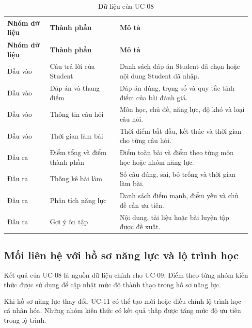 \begin{longtable}{|p{3.5cm}|p{5.3cm}|p{5.6cm}|}
	\caption{Dữ liệu của UC-08}
	\label{tab:uc08-data}\\
	\hline
	\textbf{Nhóm dữ liệu} &
	\textbf{Thành phần} &
	\textbf{Mô tả} \\
	\hline
	\endfirsthead
	
	\hline
	\textbf{Nhóm dữ liệu} &
	\textbf{Thành phần} &
	\textbf{Mô tả} \\
	\hline
	\endhead
	
	Đầu vào &
	Câu trả lời của Student &
	Danh sách đáp án Student đã chọn hoặc nội dung Student đã nhập. \\
	\hline
	
	Đầu vào &
	Đáp án và thang điểm &
	Đáp án đúng, trọng số và quy tắc tính điểm của bài đánh giá. \\
	\hline
	
	Đầu vào &
	Thông tin câu hỏi &
	Môn học, chủ đề, năng lực, độ khó và loại câu hỏi. \\
	\hline
	
	Đầu vào &
	Thời gian làm bài &
	Thời điểm bắt đầu, kết thúc và thời gian cho từng câu hỏi. \\
	\hline
	
	Đầu ra &
	Điểm tổng và điểm thành phần &
	Điểm toàn bài và điểm theo từng môn học hoặc nhóm năng lực. \\
	\hline
	
	Đầu ra &
	Thống kê bài làm &
	Số câu đúng, sai, bỏ trống và thời gian làm bài. \\
	\hline
	
	Đầu ra &
	Phân tích năng lực &
	Danh sách điểm mạnh, điểm yếu và chủ đề cần ưu tiên. \\
	\hline
	
	Đầu ra &
	Gợi ý ôn tập &
	Nội dung, tài liệu hoặc bài luyện tập được đề xuất. \\
	\hline
	
\end{longtable}

\subsection{Mối liên hệ với hồ sơ năng lực và lộ trình học}

Kết quả của UC-08 là nguồn dữ liệu chính cho UC-09. Điểm theo từng nhóm
kiến thức được sử dụng để cập nhật mức độ thành thạo trong hồ sơ năng
lực.

Khi hồ sơ năng lực thay đổi, UC-11 có thể tạo mới hoặc điều chỉnh lộ
trình học cá nhân hóa. Những nhóm kiến thức có kết quả thấp được tăng
mức độ ưu tiên trong lộ trình.

